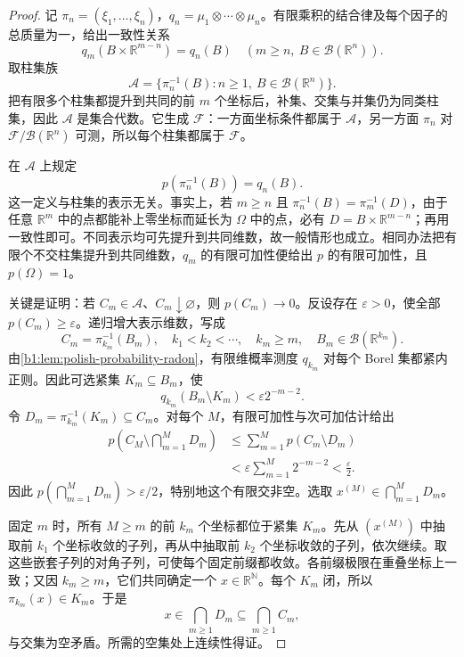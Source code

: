 \begin{proof}
记 \(\pi_n=(\xi_1,\ldots,\xi_n)\)，\(q_n=\mu_1\otimes\cdots\otimes\mu_n\)。有限乘积的结合律及每个因子的总质量为一，给出一致性关系
\[
 q_m(B\times\mathbb R^{m-n})=q_n(B)
 \quad(m\geq n,\ B\in\mathcal B(\mathbb R^n)).
\]
取柱集族
\[
 \mathcal A=\{\pi_n^{-1}(B):n\geq1,\ B\in\mathcal B(\mathbb R^n)\}.
\]
把有限多个柱集都提升到共同的前 \(m\) 个坐标后，补集、交集与并集仍为同类柱集，因此 \(\mathcal A\) 是集合代数。它生成 \(\mathcal F\)：一方面坐标条件都属于 \(\mathcal A\)，另一方面 \(\pi_n\) 对 \(\mathcal F/\mathcal B(\mathbb R^n)\) 可测，所以每个柱集都属于 \(\mathcal F\)。

在 \(\mathcal A\) 上规定
\[
 p(\pi_n^{-1}(B))=q_n(B).
\]
这一定义与柱集的表示无关。事实上，若 \(m\geq n\) 且 \(\pi_n^{-1}(B)=\pi_m^{-1}(D)\)，由于任意 \(\mathbb R^m\) 中的点都能补上零坐标而延长为 \(\Omega\) 中的点，必有 \(D=B\times\mathbb R^{m-n}\)；再用一致性即可。不同表示均可先提升到共同维数，故一般情形也成立。相同办法把有限个不交柱集提升到共同维数，\(q_m\) 的有限可加性便给出 \(p\) 的有限可加性，且 \(p(\Omega)=1\)。

关键是证明：若 \(C_m\in\mathcal A\)、\(C_m\downarrow\varnothing\)，则 \(p(C_m)\to0\)。反设存在 \(\varepsilon>0\)，使全部 \(p(C_m)\geq\varepsilon\)。递归增大表示维数，写成
\[
 C_m=\pi_{k_m}^{-1}(B_m),
 \quad k_1<k_2<\cdots,\quad k_m\geq m,
 \quad B_m\in\mathcal B(\mathbb R^{k_m}).
\]
由\cref{b1:lem:polish-probability-radon}，有限维概率测度 \(q_{k_m}\) 对每个 Borel 集都紧内正则。因此可选紧集 \(K_m\subseteq B_m\)，使
\[
 q_{k_m}(B_m\setminus K_m)<\varepsilon2^{-m-2}.
\]
令 \(D_m=\pi_{k_m}^{-1}(K_m)\subseteq C_m\)。对每个 \(M\)，有限可加性与次可加估计给出
\[
 \begin{aligned}
 p\left(C_M\setminus\bigcap_{m=1}^MD_m\right)
 &\leq\sum_{m=1}^Mp(C_m\setminus D_m)\\
 &<\varepsilon\sum_{m=1}^M2^{-m-2}<\frac\varepsilon2.
 \end{aligned}
\]
因此 \(p(\bigcap_{m=1}^MD_m)>\varepsilon/2\)，特别地这个有限交非空。选取 \(x^{(M)}\in\bigcap_{m=1}^MD_m\)。

固定 \(m\) 时，所有 \(M\geq m\) 的前 \(k_m\) 个坐标都位于紧集 \(K_m\)。先从 \((x^{(M)})\) 中抽取前 \(k_1\) 个坐标收敛的子列，再从中抽取前 \(k_2\) 个坐标收敛的子列，依次继续。取这些嵌套子列的对角子列，可使每个固定前缀都收敛。各前缀极限在重叠坐标上一致；又因 \(k_m\geq m\)，它们共同确定一个 \(x\in\mathbb R^{\mathbb N}\)。每个 \(K_m\) 闭，所以 \(\pi_{k_m}(x)\in K_m\)。于是
\[
 x\in\bigcap_{m\geq1}D_m\subseteq\bigcap_{m\geq1}C_m,
\]
与交集为空矛盾。所需的空集处上连续性得证。


\end{proof}
